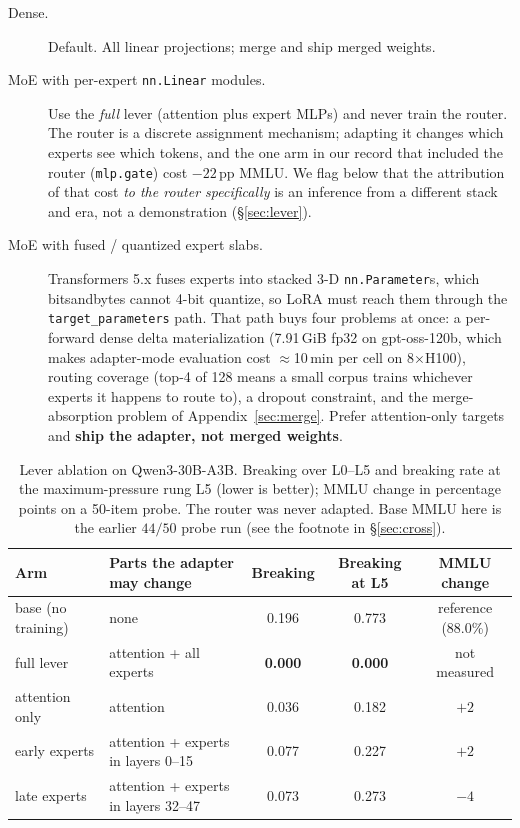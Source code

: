 \begin{description}
  \item[Dense.] Default. All linear projections; merge and ship merged weights.
  \item[MoE with per-expert \texttt{nn.Linear} modules.] Use the \emph{full} lever (attention plus
  expert MLPs) and never train the router. The router is a discrete assignment mechanism;
  adapting it changes which experts see which tokens, and the one arm in our record that included the
  router (\texttt{mlp.gate}) cost $-22$\,pp MMLU. We flag below that the attribution of that cost
  \emph{to the router specifically} is an inference from a different stack and era, not a
  demonstration (\S\ref{sec:lever}).
  \item[MoE with fused / quantized expert slabs.] Transformers 5.x fuses experts into stacked 3-D
  \texttt{nn.Parameter}s, which bitsandbytes cannot 4-bit quantize, so LoRA must reach them through
  the \texttt{target\_parameters} path. That path buys four problems at once: a per-forward dense
  delta materialization (7.91\,GiB fp32 on gpt-oss-120b, which makes adapter-mode evaluation cost
  $\approx$10\,min per cell on 8$\times$H100), routing coverage (top-4 of 128 means a small corpus
  trains whichever experts it happens to route to), a dropout constraint, and the merge-absorption
  problem of Appendix~\ref{sec:merge}. Prefer attention-only targets and \textbf{ship the adapter, not merged weights}.
\end{description}

\begin{table}[t]
\centering\footnotesize
\caption{Lever ablation on Qwen3-30B-A3B. Breaking \auc{} over L0--L5 and breaking rate at the
maximum-pressure rung L5 (lower is better); MMLU change in percentage points on a 50-item probe.
The router was never adapted. Base MMLU here is the earlier $44/50$ probe run (see the footnote in
\S\ref{sec:cross}).}
\label{tab:lever}
\begin{tabular}{@{}llccc@{}}
\toprule
Arm & Parts the adapter may change & Breaking \auc{} & Breaking at L5 & MMLU change \\
\midrule
base (no training) & none & 0.196 & 0.773 & reference (88.0\%) \\
full lever & attention + all experts & \textbf{0.000} & \textbf{0.000} & not measured \\
attention only & attention & 0.036 & 0.182 & $+2$ \\
early experts & attention + experts in layers 0--15 & 0.077 & 0.227 & $+2$ \\
late experts & attention + experts in layers 32--47 & 0.073 & 0.273 & $-4$ \\
\bottomrule
\end{tabular}
\end{table}

